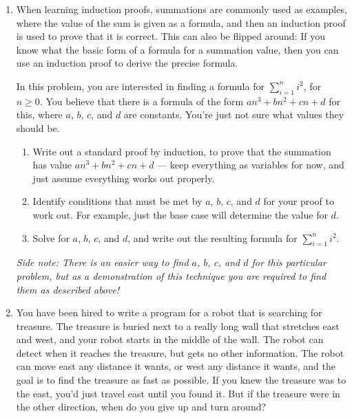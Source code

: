 \documentclass[11pt]{article}
\begin{document}
\begin{enumerate}
\item When learning induction proofs, summations are commonly used as
  examples, where the value of the sum is given as a formula, and then
  an induction proof is used to prove that it is correct. This can
  also be flipped around: If you know what the basic form of a formula
  for a summation value, then you can use an induction proof to derive
  the precise formula.

  In this problem, you are interested in finding a formula for
  $\sum_{i=1}^n i^2$, for $n\geq 0$. You believe that there is a
  formula of the form $an^3+bn^2+cn+d$ for this, where $a$, $b$, $c$,
  and $d$ are constants. You're just not sure what values they should
  be.

  \begin{enumerate}
    \item Write out a standard proof by induction, to prove that the
      summation has value $an^3+bn^2+cn+d$ --- keep everything as
      variables for now, and just assume everything works out
      properly.
    \item Identify conditions that must be met by $a$, $b$, $c$, and
      $d$ for your proof to work out. For example, just the base case
      will determine the value for $d$.
    \item Solve for $a$, $b$, $c$, and $d$, and write out the
      resulting formula for $\sum_{i=1}^n i^2$.
  \end{enumerate}

  \textsl{Side note: There is an easier way to find $a$, $b$, $c$, and
    $d$ for this particular problem, but as a demonstration of this
    technique you are required to find them as described above!}
  
\item You have been hired to write a program for a robot that is
  searching for treasure. The treasure is buried next to a really long
  wall that stretches east and west,
  and your robot starts in the middle of the wall. The robot
  can detect when it reaches the treasure,
  but gets no other information. The robot can move east any
  distance it wants, or west any distance it wants, and the goal is
  to find the treasure as fast as possible. If you knew the treasure
  was to the east, you'd just travel east until you found it. But if
  the treasure were in the other direction, when do you give up and
  turn around?


\end{enumerate}
\end{document}
